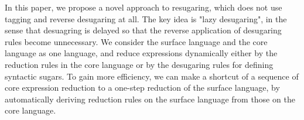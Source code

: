 In this paper, we propose a novel approach to resugaring, which does not use tagging and reverse desugaring at all.
%
%
The key idea is "lazy desugaring", in the sense that desuagring is delayed so that the reverse application of desugaring rules become unnecessary.
We consider the surface language and the core language as one language, and reduce expressions dynamically either by the reduction rules in the core language or by the desugaring rules for defining syntactic sugars. To gain more efficiency, we can make a shortcut of a sequence of core expression reduction to a one-step reduction of the surface language, by automatically deriving reduction rules on the surface language from those on the core language.
%

